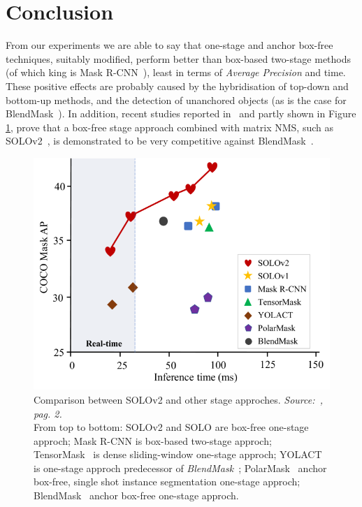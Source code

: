 \documentclass[10pt,twocolumn,letterpaper]{article}
\begin{document}
\section{Conclusion}
From our experiments we are able to say that one-stage and anchor box-free techniques, suitably modified, perform better than box-based two-stage methods (of which king is Mask R-CNN~\cite{Authors1_maskrcnn}), least in terms of \textit{Average Precision} and time. These positive effects are probably caused by the hybridisation of top-down and bottom-up methods, and the detection of unanchored objects (as is the case for BlendMask~\cite{Authors2_BlendMask}). In addition, recent studies reported in~\cite{Authors6_SOLOv2} and partly shown in Figure \ref{fig:conclusionSOLOv2}, prove that a box-free stage approach combined with matrix NMS, such as SOLOv2~\cite{Authors6_SOLOv2}, is demonstrated to be very competitive against BlendMask~\cite{Authors2_BlendMask}.
\begin{figure}[H]
\centering
  \includegraphics[width=0.7\linewidth]{./image/conclusion_SOLOv2.png}
  \caption{Comparison between SOLOv2 and other stage approches. \textit{Source:~\cite{Authors6_SOLOv2}, pag. 2.}\\ From top to bottom: SOLOv2\cite{Authors6_SOLOv2} and SOLO\cite{solo} are box-free one-stage approch; Mask R-CNN is box-based two-stage approch; TensorMask~\cite{tensormask} is dense sliding-window one-stage approch; YOLACT~\cite{yolact} is one-stage approch predecessor of \textit{BlendMask}~\cite{Authors2_BlendMask}; PolarMask~\cite{polarmask} anchor box-free, single shot instance segmentation one-stage approch; BlendMask~\cite{Authors2_BlendMask} anchor box-free one-stage approch.}
  \label{fig:conclusionSOLOv2}
\noindent
\end{figure}
\end{document}
